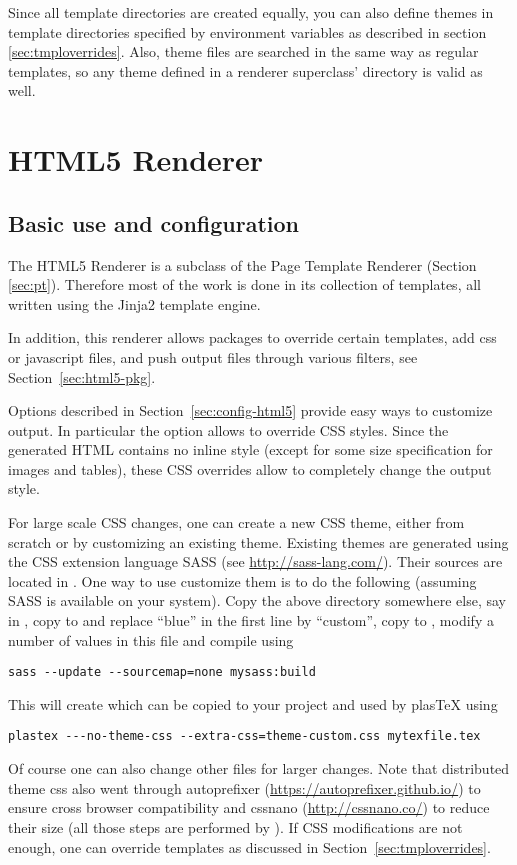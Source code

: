 Since all template directories are created equally, you can also define
themes in template directories specified by environment variables as
described in section \ref{sec:tmploverrides}.  Also, theme files are
searched in the same way as regular templates, so any theme defined
in a renderer superclass' directory is valid as well.

\section{HTML5 Renderer}\label{sec:html5}

\subsection{Basic use and configuration}

The HTML5 Renderer is a subclass of the Page Template Renderer (Section
\ref{sec:pt}). Therefore most of the work is done in its collection of
templates, all written using the Jinja2 template engine.

In addition, this renderer allows packages to override certain templates,
add css or javascript files, and push output files through various
filters, see Section~\ref{sec:html5-pkg}.

Options described in Section~\ref{sec:config-html5} provide easy ways to
customize output. In particular the  option
allows to override CSS styles. Since the generated HTML contains no
inline style (except for some size specification for images and tables),
these CSS overrides allow to completely change the output style.

For large scale CSS changes, one can create a new
CSS theme, either from scratch or by customizing an existing theme.
Existing themes are generated using the CSS extension language SASS (see
\url{http://sass-lang.com/}). Their sources are located in
. One way to use customize
them is to do the following (assuming SASS is available on your system).
Copy the above directory somewhere else, say in , copy
 to  and replace ``blue''
in the first line by ``custom'', copy  to
, modify a number of values in this file
and compile using
\begin{verbatim}
sass --update --sourcemap=none mysass:build
\end{verbatim}
This will create  which can be copied to
your project and used by plasTeX using
\begin{verbatim}
plastex ---no-theme-css --extra-css=theme-custom.css mytexfile.tex
\end{verbatim}
Of course one can also change other  files for larger
changes. Note that distributed theme css also went through autoprefixer
(\url{https://autoprefixer.github.io/}) to ensure cross browser
compatibility and cssnano (\url{http://cssnano.co/}) to reduce their
size (all those steps are performed by
). If CSS
modifications are not enough, one can override templates as discussed in
Section~\ref{sec:tmploverrides}.


